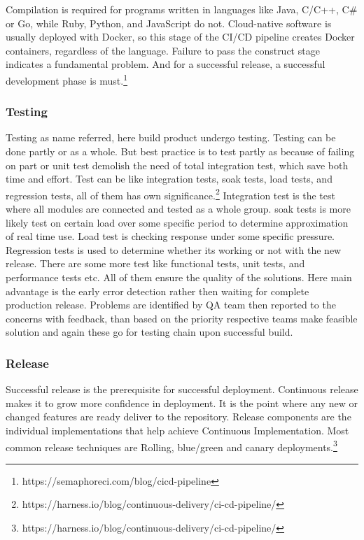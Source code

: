 Compilation is required for programs written in languages like Java, C/C++, C\# or Go, while Ruby, Python, and JavaScript do not. Cloud-native software is usually deployed with Docker, so this stage of the CI/CD pipeline creates Docker containers, regardless of the language. Failure to pass the construct stage indicates a fundamental problem. And for a successful release, a successful development phase is must.\footnote{https://semaphoreci.com/blog/cicd-pipeline}


\subsubsection{Testing}
Testing as name referred, here build product undergo testing. Testing can be done partly or as a whole. But best practice is to test partly as because of failing on part or unit test demolish the need of total integration test, which save both time and effort. Test can be like integration tests, soak tests, load tests, and regression tests, all of them has own significance.\footnote{https://harness.io/blog/continuous-delivery/ci-cd-pipeline/} Integration test is the test where all modules are connected and tested as a whole group. soak tests is more likely test on certain load over some specific period to determine approximation of real time use. Load test is checking response under some specific pressure. Regression tests is used to determine whether its working or not with the new release. There are some more test like  functional tests, unit tests, and performance tests etc. All of them ensure the quality of the solutions. Here main advantage is the early error detection rather then waiting for complete production release. Problems are identified by QA team then reported to the concerns with feedback, than based on the priority respective teams make feasible solution and again these go for testing chain upon successful build.


\subsubsection{Release}

Successful release is the prerequisite for successful deployment. Continuous release makes it to grow more confidence in deployment. It is the point where any new or changed features are ready deliver to the repository. Release components are the individual implementations that help achieve Continuous Implementation. Most common release techniques are Rolling, blue/green and canary deployments.\footnote{https://harness.io/blog/continuous-delivery/ci-cd-pipeline/}

